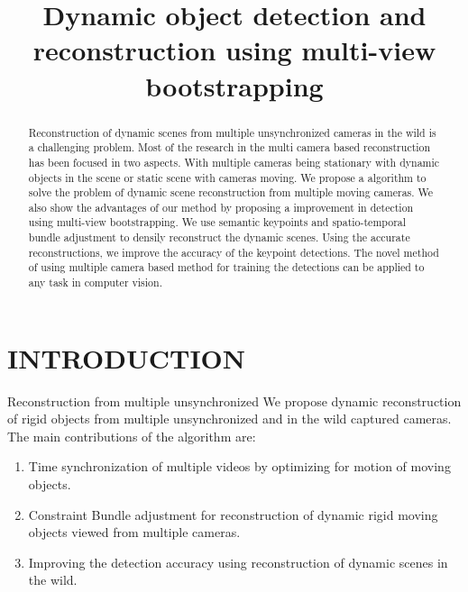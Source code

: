 \documentclass[10pt,twocolumn,letterpaper]{article}
\begin{document}
\title{Dynamic object detection and reconstruction using multi-view bootstrapping}


\maketitle

\begin{abstract}
Reconstruction of dynamic scenes from multiple unsynchronized cameras in the wild is a challenging problem. Most of the research in the multi camera based reconstruction has been focused in two aspects. With multiple cameras being stationary with dynamic objects in the scene or static scene with cameras moving. We propose a algorithm to solve the problem of dynamic scene reconstruction from multiple moving cameras. We also show the advantages of our method by proposing a improvement in detection using multi-view bootstrapping. We use semantic keypoints and spatio-temporal bundle adjustment to densily reconstruct the dynamic scenes. Using the accurate reconstructions, we improve the accuracy of the keypoint detections. The novel method of using multiple camera based method for training the detections can be applied to any task in computer vision.      
\end{abstract}
\section{INTRODUCTION}
Reconstruction from multiple unsynchronized We propose dynamic reconstruction of rigid objects from multiple unsynchronized and in the wild captured cameras. The main contributions of the algorithm are:
\begin{enumerate}
\item  Time synchronization of multiple videos by optimizing for motion of moving objects. 
\item Constraint Bundle adjustment for reconstruction of dynamic rigid moving objects viewed from multiple cameras. 
\item Improving the detection accuracy using reconstruction of dynamic scenes in the wild.
\end{enumerate}
\end{document}
